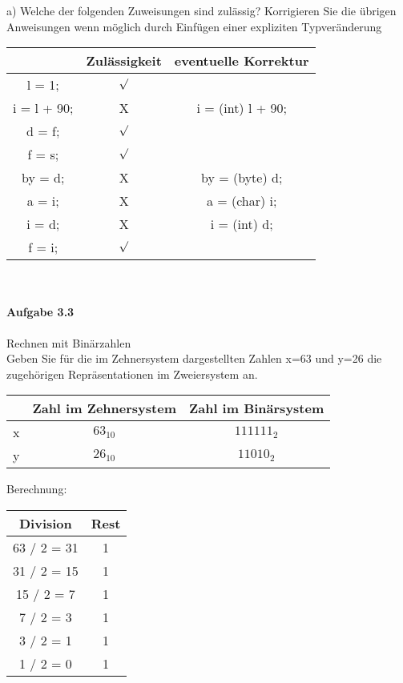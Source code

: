 \documentclass[paper=a4, fontsize=11pt]{scrartcl}
\numberwithin{equation}{section}
\numberwithin{figure}{section}
\numberwithin{table}{section}
\begin{document}
a) Welche der folgenden Zuweisungen sind zulässig? Korrigieren Sie die übrigen Anweisungen wenn möglich durch Einfügen einer expliziten Typveränderung \\

  \begin{tabular}{|c|c|c|}
  \hline
            & Zulässigkeit & eventuelle Korrektur \\
  \hline
l = 1;      & $\surd$  & \\
  \hline
i = l + 90; & X & i = (int) l + 90;\\
  \hline
d = f;      & $\surd$  & \\
  \hline
f = s;      & $\surd$  & \\
  \hline
by = d;     & X & by = (byte) d;\\
  \hline
a = i;      & X & a = (char) i;\\
  \hline
i = d;      & X & i = (int) d; \\
  \hline
f = i;      & $\surd$ & \\
  \hline
  \end{tabular}
\\


\paragraph{Aufgabe 3.3} Rechnen mit Binärzahlen \\
Geben Sie für die im Zehnersystem dargestellten Zahlen x=63 und y=26 die zugehörigen Repräsentationen im Zweiersystem an. \\

\begin{center}
  \begin{tabular}{|c|c|c|}
  \hline
            & Zahl im Zehnersystem & Zahl im Binärsystem \\
  \hline
x    & $63_{10}$  & $111111_{2}$\\
  \hline
y    & $26_{10}$ & $11010_{2}$\\
  \hline
  \end{tabular}
\end{center} 

Berechnung: \\
  \begin{tabular}{|c|c|}
  \hline
Division & Rest\\
  \hline
63 / 2 = 31 & 1 \\
  \hline
31 / 2 = 15  & 1 \\
  \hline
15 / 2 = 7  & 1 \\
  \hline
7 / 2 = 3  & 1 \\
  \hline
3 / 2 = 1  & 1 \\
  \hline
1 / 2 = 0  & 1 \\
  \hline
  \end{tabular} \\
  
\end{document}
